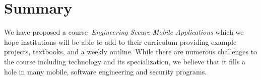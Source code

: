 \documentclass{sig-alternate}
\begin{document}
\section{Summary}
\label{sec: summary}

We have proposed a course~\emph{Engineering Secure Mobile Applications} which we hope institutions will be able to add to their curriculum providing example projects, textbooks, and a weekly outline. While there are numerous challenges to the course including technology and its specialization, we believe that it fills a hole in many mobile, software engineering and security programs.


\balance


\end{document}
